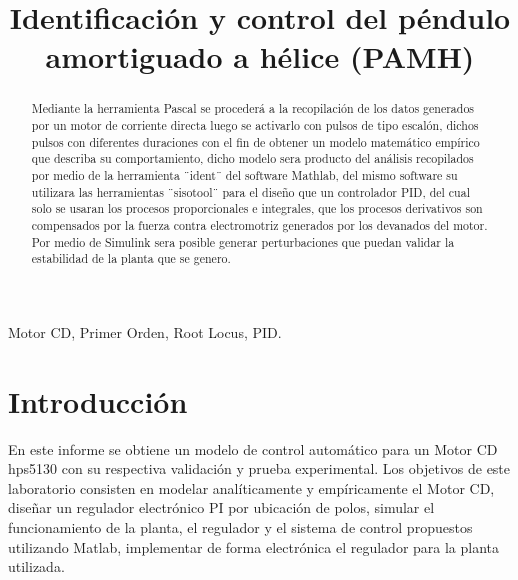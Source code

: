 \documentclass[conference]{IEEEtran}
\begin{document}
\title{Identificación y control del péndulo amortiguado a hélice (PAMH)}

\author{
\vspace{2mm}
}

\maketitle

\begin{abstract}
Mediante la herramienta Pascal se procederá a la recopilación de los datos generados por un motor de corriente directa luego se activarlo con pulsos de tipo escalón, dichos pulsos con diferentes duraciones con el fin de obtener un modelo matemático empírico que describa su comportamiento, dicho modelo sera producto del análisis recopilados por medio de la herramienta ¨ident¨ del software Mathlab, del mismo software su utilizara las herramientas ¨sisotool¨ para el diseño que un controlador PID, del cual solo se usaran los procesos proporcionales e integrales, que los procesos derivativos son compensados por la fuerza contra electromotriz generados por los devanados del motor. Por medio de Simulink sera posible generar perturbaciones que puedan validar la estabilidad de la planta que se genero.


\end{abstract}
\begin{IEEEkeywords}
Motor CD, Primer Orden, Root Locus, PID.
\end{IEEEkeywords}

\IEEEpeerreviewmaketitle

\section{Introducción}

En este informe se obtiene un modelo de control automático para un Motor CD hps5130 con su respectiva validación y prueba experimental. Los objetivos de este laboratorio consisten en modelar analíticamente y empíricamente el Motor CD, diseñar un regulador electrónico PI por ubicación de polos, simular el funcionamiento de la planta, el regulador y el sistema de control propuestos utilizando Matlab, implementar de forma electrónica el regulador para la planta utilizada.
\end{document}
